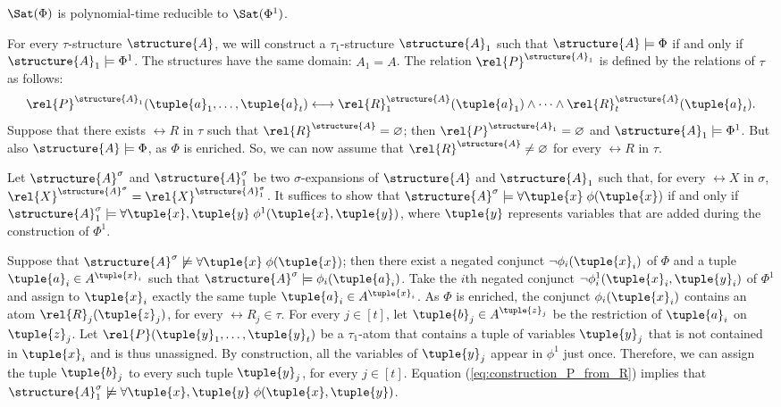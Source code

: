 \documentclass{lmcs}
\begin{document}
\begin{lem}\label{lemma:one_symbol1} 
$\Sat(\Phi)$ is polynomial-time reducible to $\Sat(\Phi^1)$.
\end{lem}
\proof
For every $\tau$-structure $\structure{A}$, we will construct a $\tau_1$-structure $\structure{A}_1$ such that $\structure{A}\models\Phi$ if and only if $\structure{A}_1\models\Phi^1$.
The structures have the same domain: $A_1=A$.
The relation $\rel{P}^{\structure{A}_1}$ is defined by the relations of $\tau$ as follows:
\begin{equation}\label{eq:construction_P_from_R}
\rel{P}^{\structure{A}_1}(\tuple{a}_1,\ldots,\tuple{a}_t)\longleftrightarrow\rel{R}_1^\structure{A}(\tuple{a}_1)\wedge\dots\wedge\rel{R}_t^\structure{A}(\tuple{a}_t).
\end{equation} 
Suppose that there exists $\rel{R}$ in $\tau$ such that $\rel{R}^\structure{A}=\varnothing$; then $\rel{P}^{\structure{A}_1}=\varnothing$ and $\structure{A}_1\models\Phi^1$.
But also $\structure{A}\models\Phi$, as $\Phi$ is enriched.
So, we can now assume that $\rel{R}^\structure{A}\not=\varnothing$ for every $\rel{R}$ in $\tau$.



Let $\structure{A}^\sigma$ and $\structure{A}_1^\sigma$ be two $\sigma$-expansions of $\structure{A}$ and $\structure{A}_1$ such that, for every $\rel{X}$ in $\sigma$, $\rel{X}^{\structure{A}^\sigma}=\rel{X}^{\structure{A}_1^\sigma}$.
It suffices to show that $\structure{A}^\sigma\models\forall\tuple{x}\;\phi(\tuple{x})$ if and only if $\structure{A}_1^\sigma\models\forall\tuple{x},\tuple{y}\;\phi^1(\tuple{x},\tuple{y})$, where $\tuple{y}$ represents variables that are added during the construction of $\Phi^1$.

Suppose that $\structure{A}^\sigma\not\models\forall\tuple{x}\;\phi(\tuple{x})$; then there exist a negated conjunct $\neg\phi_i(\tuple{x}_i)$ of $\Phi$ and a tuple $\tuple{a}_i\in A^{\tuple{x}_i}$ such that  $\structure{A}^\sigma\models\phi_i(\tuple{a}_i)$.
Take the $i$th negated conjunct $\neg\phi_i^1(\tuple{x}_i,\tuple{y}_i)$ of $\Phi^1$ and assign to $\tuple{x}_i$ exactly the same tuple $\tuple{a}_i\in A^{\tuple{x}_i}$.
As $\Phi$ is enriched, the conjunct $\phi_i(\tuple{x}_i)$ contains an atom $\rel{R}_j(\tuple{z}_j)$, for every $\rel{R}_j\in\tau$.
For every $j\in[t]$, let $\tuple{b}_j\in A^{\tuple{z}_j}$ be the restriction of $\tuple{a}_i$ on $\tuple{z}_j$.
Let $\rel{P}(\tuple{y}_1,\ldots,\tuple{y}_t)$ be a $\tau_1$-atom that contains a tuple of variables $\tuple{y}_j$ that is not contained in $\tuple{x}_i$ and is thus unassigned.
By construction, all the variables of $\tuple{y}_j$ appear in $\phi^1$ just once.
Therefore, we can assign the tuple $\tuple{b}_j$ to every such tuple $\tuple{y}_j$, for every $j\in[t]$.
Equation (\ref{eq:construction_P_from_R}) implies that $\structure{A}_1^\sigma\not\models\forall\tuple{x},\tuple{y}\;\phi(\tuple{x},\tuple{y})$. 
\end{document}
